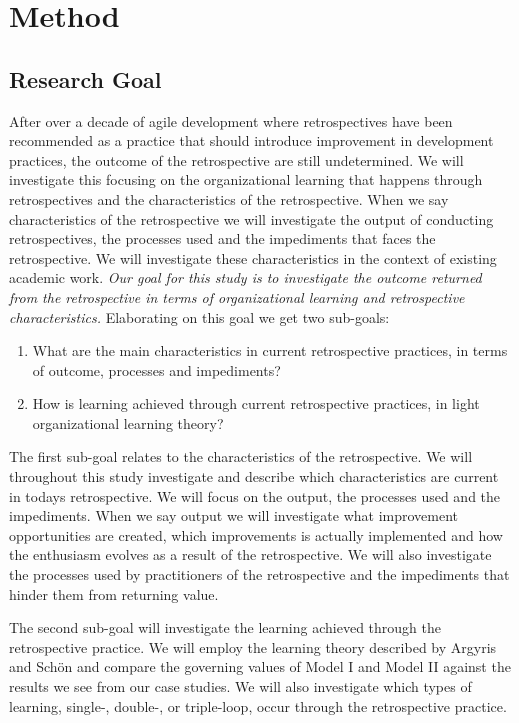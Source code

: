 \chapter{Method}
\section{Research Goal}
After over a decade of agile development where retrospectives have been recommended as a practice that should introduce improvement in development practices, the outcome of the retrospective are still undetermined. We will investigate this focusing on the organizational learning that happens through retrospectives and the characteristics of the retrospective. When we say characteristics of the retrospective we will investigate the output of conducting retrospectives, the processes used and the impediments that faces the retrospective. We will investigate these characteristics in the context of existing academic work. \textit{Our goal for this study is to investigate the outcome returned from the retrospective in terms of organizational learning and retrospective characteristics.} Elaborating on this goal we get two sub-goals: 

\begin{enumerate}
	\item What are the main characteristics in current retrospective practices, in terms of outcome, processes and impediments? 
	\item How is learning achieved through current retrospective practices, in light organizational learning theory? 
\end{enumerate}

The first sub-goal relates to the characteristics of the retrospective. We will throughout this study investigate and describe which characteristics are current in todays retrospective. We will focus on the output, the processes used and the impediments. When we say output we will investigate what improvement opportunities are created, which improvements is actually implemented and how the enthusiasm evolves as a result of the retrospective. We will also investigate the processes used by practitioners of the retrospective and the impediments that hinder them from returning value. 

The second sub-goal will investigate the learning achieved through the retrospective practice. We will employ the learning theory described by Argyris and Schön \cite{Argyris1996} and compare the governing values of Model I and Model II against the results we see from our case studies. We will also investigate which types of learning, single-, double-, or triple-loop, occur through the retrospective practice. 

